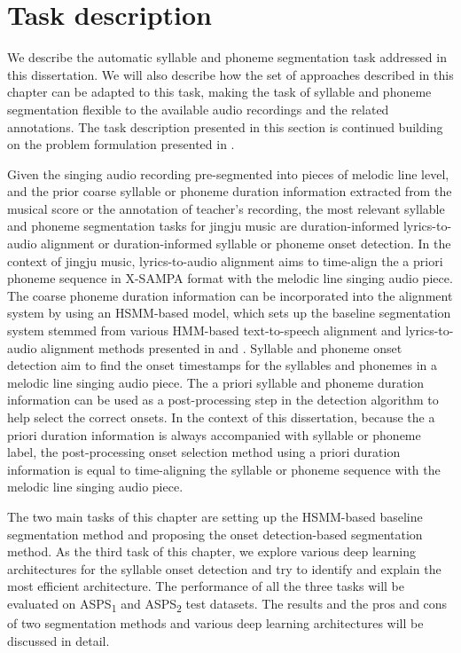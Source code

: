 \section{Task description}\label{sec:ch5:description}

We describe the automatic syllable and phoneme segmentation task addressed in this dissertation. We will also describe how the set of approaches described in this chapter can be adapted to this task, making the task of syllable and phoneme segmentation flexible to the available audio recordings and the related annotations. The task description presented in this section is continued building on the problem formulation presented in . 

Given the singing audio recording pre-segmented into pieces of melodic line level, and the prior coarse syllable or phoneme duration information extracted from the musical score or the annotation of teacher's recording, the most relevant syllable and phoneme segmentation tasks for jingju music are duration-informed lyrics-to-audio alignment or duration-informed syllable or phoneme onset detection. In the context of jingju music, lyrics-to-audio alignment aims to time-align the a priori phoneme sequence in X-SAMPA format with the melodic line singing audio piece. The coarse phoneme duration information can be incorporated into the alignment system by using an HSMM-based model, which sets up the baseline segmentation system stemmed from various HMM-based text-to-speech alignment and lyrics-to-audio alignment methods presented in  and . Syllable and phoneme onset detection aim to find the onset timestamps for the syllables and phonemes in a melodic line singing audio piece. The a priori syllable and phoneme duration information can be used as a post-processing step in the detection algorithm to help select the correct onsets. In the context of this dissertation, because the a priori duration information is always accompanied with syllable or phoneme label, the post-processing onset selection method using a priori duration information is equal to time-aligning the syllable or phoneme sequence with the melodic line singing audio piece. 

The two main tasks of this chapter are setting up the HSMM-based baseline segmentation method and proposing the onset detection-based segmentation method. As the third task of this chapter, we explore various deep learning architectures for the syllable onset detection and try to identify and explain the most efficient architecture. The performance of all the three tasks will be evaluated on ASPS\textsubscript{1} and ASPS\textsubscript{2} test datasets. The results and the pros and cons of two segmentation methods and various deep learning architectures will be discussed in detail.

